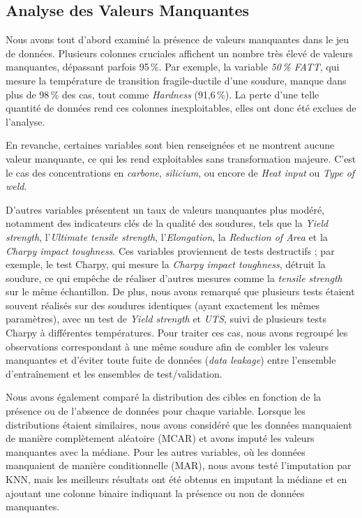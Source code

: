 \documentclass{article}
\begin{document}
\subsection{Analyse des Valeurs Manquantes}

Nous avons tout d'abord examiné la présence de valeurs manquantes dans le jeu de données. Plusieurs colonnes cruciales affichent un nombre très élevé de valeurs manquantes, dépassant parfois 95\,\%. Par exemple, la variable \textit{50\,\% FATT}, qui mesure la température de transition fragile-ductile d'une soudure, manque dans plus de 98\,\% des cas, tout comme \textit{Hardness} (91,6\,\%). La perte d'une telle quantité de données rend ces colonnes inexploitables, elles ont donc été exclues de l'analyse.

En revanche, certaines variables sont bien renseignées et ne montrent aucune valeur manquante, ce qui les rend exploitables sans transformation majeure. C'est le cas des concentrations en \textit{carbone}, \textit{silicium}, ou encore de \textit{Heat input} ou \textit{Type of weld}.

D'autres variables présentent un taux de valeurs manquantes plus modéré, notamment des indicateurs clés de la qualité des soudures, tels que la \textit{Yield strength}, l'\textit{Ultimate tensile strength}, l'\textit{Elongation}, la \textit{Reduction of Area} et la \textit{Charpy impact toughness}. Ces variables proviennent de tests destructifs ; par exemple, le test Charpy, qui mesure la \textit{Charpy impact toughness}, détruit la soudure, ce qui empêche de réaliser d'autres mesures comme la \textit{tensile strength} sur le même échantillon. De plus, nous avons remarqué que plusieurs tests étaient souvent réalisés sur des soudures identiques (ayant exactement les mêmes paramètres), avec un test de \textit{Yield strength} et \textit{UTS}, suivi de plusieurs tests Charpy à différentes températures. Pour traiter ces cas, nous avons regroupé les observations correspondant à une même soudure afin de combler les valeurs manquantes et d'éviter toute fuite de données (\textit{data leakage}) entre l'ensemble d'entraînement et les ensembles de test/validation.

Nous avons également comparé la distribution des cibles en fonction de la présence ou de l'absence de données pour chaque variable. Lorsque les distributions étaient similaires, nous avons considéré que les données manquaient de manière complètement aléatoire (MCAR) et avons imputé les valeurs manquantes avec la médiane. Pour les autres variables, où les données manquaient de manière conditionnelle (MAR), nous avons testé l'imputation par KNN, mais les meilleurs résultats ont été obtenus en imputant la médiane et en ajoutant une colonne binaire indiquant la présence ou non de données manquantes.
\end{document}
